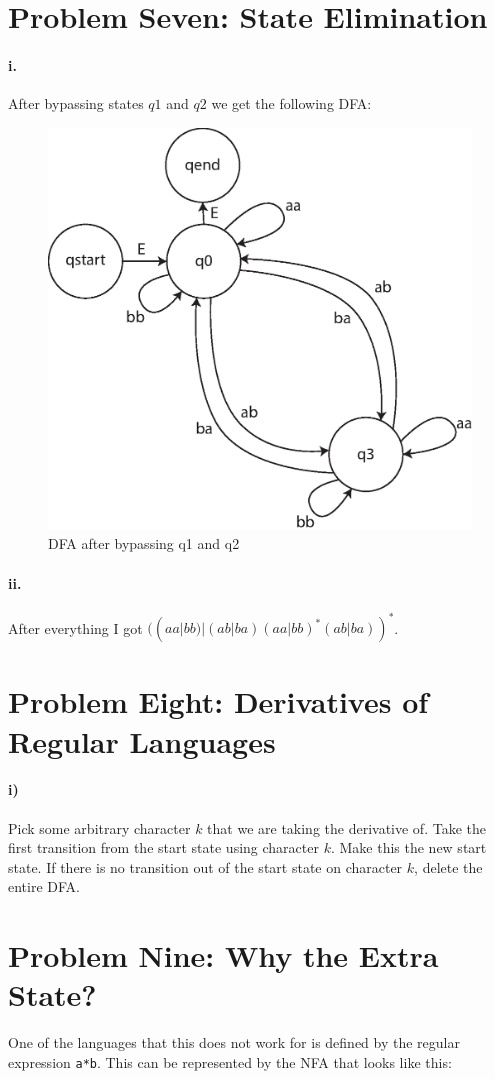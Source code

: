 \documentclass[10pt,letter]{article}
\begin{document}
\section*{Problem Seven: State Elimination}

\paragraph{i.} After bypassing states $q1$ and $q2$ we get the following DFA:\\

\begin{figure}[h]
\centering
  \includegraphics[width=0.45\linewidth]{7i.eps}
  \caption{DFA after bypassing q1 and q2}
  \label{fig:7i}
\end{figure}

\paragraph{ii.} After everything I got $( (aa|bb) | (ab|ba) (aa|bb)^* (ab|ba))^*$.

\section*{Problem Eight: Derivatives of Regular Languages}

\paragraph{i)} Pick some arbitrary character $k$ that we are taking the derivative of. Take the first transition from the start state using character $k$. Make this the new start state. If there is no transition out of the start state on character $k$, delete the entire DFA.


\section*{Problem Nine: Why the Extra State?} 
One of the languages that this does not work for is defined by the regular expression \texttt{a*b}. This can be represented by the NFA that looks like this:
\end{document}
